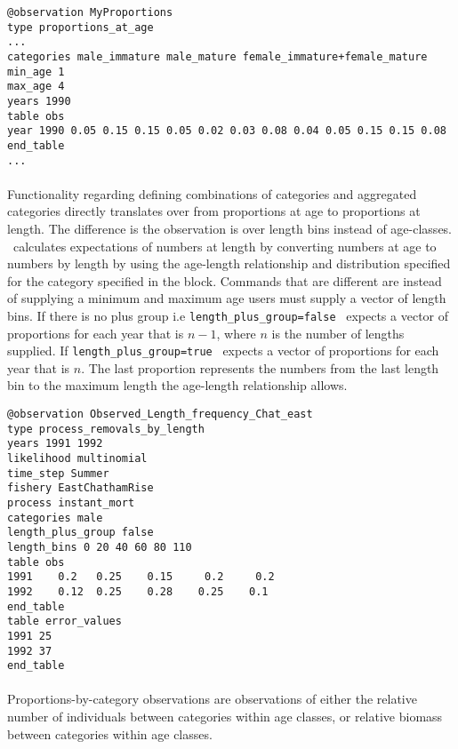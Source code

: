{{{{{\small{\begin{verbatim}
@observation MyProportions
type proportions_at_age
...
categories male_immature male_mature female_immature+female_mature
min_age 1
max_age 4
years 1990
table obs
year 1990 0.05 0.15 0.15 0.05 0.02 0.03 0.08 0.04 0.05 0.15 0.15 0.08
end_table
...
\end{verbatim}}}


\paragraph*{}
Functionality regarding defining combinations of categories and aggregated categories directly translates over from proportions at age to proportions at length. The difference is the observation is over length bins instead of age-classes. \CNAME\ calculates expectations of numbers at length by converting numbers at age to numbers by length by using the age-length relationship and distribution specified for the category specified in the  block. Commands that are different are instead of supplying a minimum and maximum age users must supply a vector of length bins. If there is no plus group i.e \texttt{length\_plus\_group=false} \CNAME\ expects a vector of proportions for each year that is $n - 1$, where $n$ is the number of lengths supplied. If \texttt{length\_plus\_group=true} \CNAME\ expects a vector of proportions for each year that is $n$. The last proportion represents the numbers from the last length bin to the maximum length the age-length relationship allows.


{\small{\begin{verbatim}
@observation Observed_Length_frequency_Chat_east
type process_removals_by_length
years 1991 1992
likelihood multinomial
time_step Summer
fishery EastChathamRise
process instant_mort
categories male
length_plus_group false
length_bins 0 20 40 60 80 110
table obs
1991    0.2   0.25    0.15     0.2     0.2 
1992    0.12  0.25    0.28    0.25    0.1 
end_table
table error_values
1991 25
1992 37
end_table  
\end{verbatim}}}
 
\paragraph*{\label{sec:proportions-by-category}}
Proportions-by-category observations are observations of either the relative number of individuals between categories within age classes, or relative biomass between categories within age classes. 

}}}}
